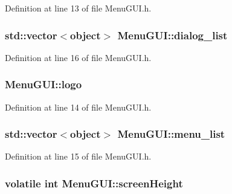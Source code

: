 Definition at line 13 of file Menu\-G\-U\-I.\-h.

\hypertarget{class_menu_g_u_i_a2f433c33f8a0e3e6e37b79b6fb0dc57d}{
\subsubsection[{dialog\-\_\-list}]{\setlength{\rightskip}{0pt plus 5cm}std\-::vector$<${\bf object}$>$ Menu\-G\-U\-I\-::dialog\-\_\-list}}\label{class_menu_g_u_i_a2f433c33f8a0e3e6e37b79b6fb0dc57d}


Definition at line 16 of file Menu\-G\-U\-I.\-h.

\hypertarget{class_menu_g_u_i_a04d8a13b8437fa0ae19d5913f18678e3}{
\subsubsection[{logo}]{ Menu\-G\-U\-I\-::logo}}\label{class_menu_g_u_i_a04d8a13b8437fa0ae19d5913f18678e3}


Definition at line 14 of file Menu\-G\-U\-I.\-h.

\hypertarget{class_menu_g_u_i_afb740b4478b7214db49bcfb8bca4350d}{
\subsubsection[{menu\-\_\-list}]{\setlength{\rightskip}{0pt plus 5cm}std\-::vector$<${\bf object}$>$ Menu\-G\-U\-I\-::menu\-\_\-list}}\label{class_menu_g_u_i_afb740b4478b7214db49bcfb8bca4350d}


Definition at line 15 of file Menu\-G\-U\-I.\-h.

\hypertarget{class_menu_g_u_i_a41dee14f0233c0a7159f0601b3016e3a}{
\subsubsection[{screen\-Height}]{\setlength{\rightskip}{0pt plus 5cm}volatile int Menu\-G\-U\-I\-::screen\-Height}}\label{class_menu_g_u_i_a41dee14f0233c0a7159f0601b3016e3a}


